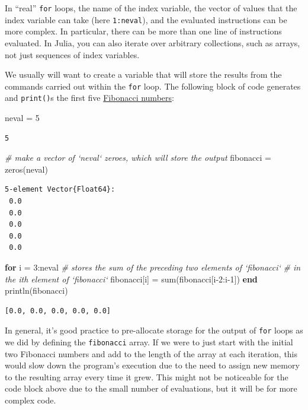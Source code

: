 \documentclass[
  11pt,
]{book}
\newenvironment{Shaded}{\begin{snugshade}}{\end{snugshade}}
\newcommand{\CommentTok}[1]{\textcolor[rgb]{0.37,0.37,0.37}{\textit{#1}}}
\newcommand{\FloatTok}[1]{\textcolor[rgb]{0.06,0.06,0.06}{#1}}
\newcommand{\KeywordTok}[1]{\textcolor[rgb]{0.27,0.27,0.27}{\textbf{#1}}}
\newcommand{\NormalTok}[1]{#1}
\begin{document}
In \enquote{real} \texttt{for} loops, the name of the index variable, the vector of values that the index variable can take (here \texttt{1:neval}), and the evaluated instructions can be more complex. In particular, there can be more than one line of instructions evaluated. In Julia, you can also iterate over arbitrary collections, such as arrays, not just sequences of index variables.

We usually will want to create a variable that will store the results from the commands carried out within the \texttt{for} loop. The following block of code generates and \texttt{print()}s the first five \href{https://en.wikipedia.org/wiki/Fibonacci_number}{Fibonacci numbers}:

\begin{Shaded}
\begin{Highlighting}[]
\NormalTok{neval = }\FloatTok{5} 
\end{Highlighting}
\end{Shaded}

\begin{verbatim}
5
\end{verbatim}

\begin{Shaded}
\begin{Highlighting}[]
 \CommentTok{# make a vector of `neval` zeroes, which will store the output}
\NormalTok{fibonacci = zeros(neval)}
\end{Highlighting}
\end{Shaded}

\begin{verbatim}
5-element Vector{Float64}:
 0.0
 0.0
 0.0
 0.0
 0.0
\end{verbatim}

\begin{Shaded}
\begin{Highlighting}[]
\KeywordTok{for}\NormalTok{ i = }\FloatTok{3}\NormalTok{:neval}
  \CommentTok{# stores the sum of the preceding two elements of `fibonacci` }
  \CommentTok{# in the ith element of `fibonacci`}
\NormalTok{  fibonacci[i] = sum(fibonacci[i-}\FloatTok{2}\NormalTok{:i-}\FloatTok{1}\NormalTok{])}
\KeywordTok{end}
\NormalTok{println(fibonacci)}
\end{Highlighting}
\end{Shaded}

\begin{verbatim}
[0.0, 0.0, 0.0, 0.0, 0.0]
\end{verbatim}

In general, it's good practice to pre-allocate storage for the output of \texttt{for} loops as we did by defining the \texttt{fibonacci} array. If we were to just start with the initial two Fibonacci numbers and add to the length of the array at each iteration, this would slow down the program's execution due to the need to assign new memory to the resulting array every time it grew. This might not be noticeable for the code block above due to the small number of evaluations, but it will be for more complex code.
\end{document}
